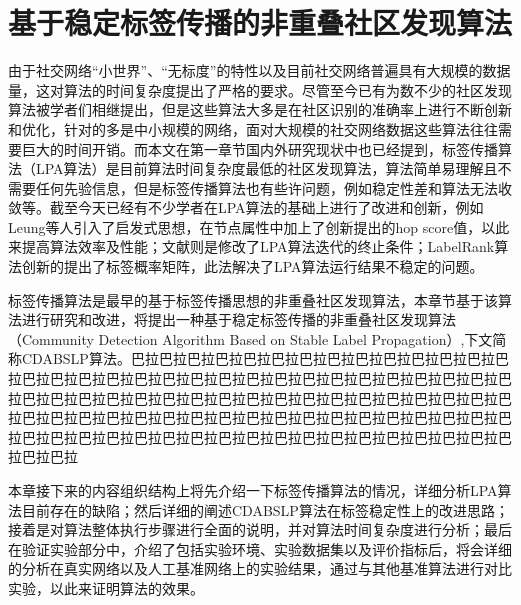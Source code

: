 \chapter{基于稳定标签传播的非重叠社区发现算法}

由于社交网络“小世界”、“无标度”的特性以及目前社交网络普遍具有大规模的数据量，这对算法的时间复杂度提出了严格的要求。尽管至今已有为数不少的社区发现算法被学者们相继提出，但是这些算法大多是在社区识别的准确率上进行不断创新和优化，针对的多是中小规模的网络，面对大规模的社交网络数据这些算法往往需要巨大的时间开销。而本文在第一章节国内外研究现状中也已经提到，标签传播算法（LPA算法）\cite{Raghavan2007Near}是目前算法时间复杂度最低的社区发现算法，算法简单易理解且不需要任何先验信息，但是标签传播算法也有些许问题，例如稳定性差和算法无法收敛等。截至今天已经有不少学者在LPA算法的基础上进行了改进和创新，例如Leung等人\cite{Leung2009Towards}引入了启发式思想，在节点属性中加上了创新提出的hop score值，以此来提高算法效率及性能；文献\cite{He2014A}则是修改了LPA算法迭代的终止条件；LabelRank算法\cite{Xie2013LabelRank}创新的提出了标签概率矩阵，此法解决了LPA算法运行结果不稳定的问题。

标签传播算法是最早的基于标签传播思想的非重叠社区发现算法，本章节基于该算法进行研究和改进，将提出一种基于稳定标签传播的非重叠社区发现算法（Community Detection Algorithm Based on Stable Label Propagation）,下文简称CDABSLP算法。巴拉巴拉巴拉巴拉巴拉巴拉巴拉巴拉巴拉巴拉巴拉巴拉巴拉巴拉巴拉巴拉巴拉巴拉巴拉巴拉巴拉巴拉巴拉巴拉巴拉巴拉巴拉巴拉巴拉巴拉巴拉巴拉巴拉巴拉巴拉巴拉巴拉巴拉巴拉巴拉巴拉巴拉巴拉巴拉巴拉巴拉巴拉巴拉巴拉巴拉巴拉巴拉巴拉巴拉巴拉巴拉巴拉巴拉巴拉巴拉巴拉巴拉巴拉巴拉巴拉巴拉巴拉巴拉巴拉巴拉巴拉巴拉巴拉巴拉巴拉巴拉巴拉巴拉巴拉巴拉巴拉巴拉巴拉巴拉巴拉巴拉巴拉巴拉


本章接下来的内容组织结构上将先介绍一下标签传播算法的情况，详细分析LPA算法目前存在的缺陷；然后详细的阐述CDABSLP算法在标签稳定性上的改进思路；接着是对算法整体执行步骤进行全面的说明，并对算法时间复杂度进行分析；最后在验证实验部分中，介绍了包括实验环境、实验数据集以及评价指标后，将会详细的分析在真实网络以及人工基准网络上的实验结果，通过与其他基准算法进行对比实验，以此来证明算法的效果。

